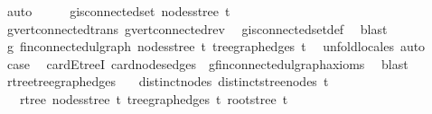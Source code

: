 \begin{isabellebody}
\ auto\isanewline
\ \ \isamarkupfalse%
\ \isamarkupfalse%
\ {\isachardoublequoteopen}g{\isachardot}{\kern0pt}is{\isacharunderscore}{\kern0pt}connected{\isacharunderscore}{\kern0pt}set\ {\isacharparenleft}{\kern0pt}nodes{\isacharunderscore}{\kern0pt}stree\ {\isacharquery}{\kern0pt}t{\isacharparenright}{\kern0pt}{\isachardoublequoteclose}\ \isamarkupfalse%
\ g{\isachardot}{\kern0pt}vert{\isacharunderscore}{\kern0pt}connected{\isacharunderscore}{\kern0pt}trans\ g{\isachardot}{\kern0pt}vert{\isacharunderscore}{\kern0pt}connected{\isacharunderscore}{\kern0pt}rev\ \isamarkupfalse%
\ g{\isachardot}{\kern0pt}is{\isacharunderscore}{\kern0pt}connected{\isacharunderscore}{\kern0pt}set{\isacharunderscore}{\kern0pt}def\ \isamarkupfalse%
\ blast\ \isanewline
\ \ \isamarkupfalse%
\ \isamarkupfalse%
\ g{\isacharcolon}{\kern0pt}\ fin{\isacharunderscore}{\kern0pt}connected{\isacharunderscore}{\kern0pt}ulgraph\ {\isachardoublequoteopen}nodes{\isacharunderscore}{\kern0pt}stree\ {\isacharquery}{\kern0pt}t{\isachardoublequoteclose}\ {\isachardoublequoteopen}tree{\isacharunderscore}{\kern0pt}graph{\isacharunderscore}{\kern0pt}edges\ {\isacharquery}{\kern0pt}t{\isachardoublequoteclose}\ \isamarkupfalse%
\ unfold{\isacharunderscore}{\kern0pt}locales\ auto\isanewline
\ \ \isamarkupfalse%
\ {\isacharquery}{\kern0pt}case\ \isamarkupfalse%
\ card{\isacharunderscore}{\kern0pt}E{\isacharunderscore}{\kern0pt}treeI\ card{\isacharunderscore}{\kern0pt}nodes{\isacharunderscore}{\kern0pt}edges\ {}{\isacharparenleft}{\kern0pt}{}{\isacharparenright}{\kern0pt}\ g{\isachardot}{\kern0pt}fin{\isacharunderscore}{\kern0pt}connected{\isacharunderscore}{\kern0pt}ulgraph{\isacharunderscore}{\kern0pt}axioms\ \isamarkupfalse%
\ blast\isanewline
{}\isamarkupfalse%
%
\endisatagproof
{\isafoldproof}%
%
\isadelimproof
\isanewline
%
\endisadelimproof
\isanewline
{}\isamarkupfalse%
\ rtree{\isacharunderscore}{\kern0pt}tree{\isacharunderscore}{\kern0pt}graph{\isacharunderscore}{\kern0pt}edges{\isacharcolon}{\kern0pt}\isanewline
\ \ \ distinct{\isacharunderscore}{\kern0pt}nodes{\isacharcolon}{\kern0pt}\ {\isachardoublequoteopen}distinct{\isacharunderscore}{\kern0pt}stree{\isacharunderscore}{\kern0pt}nodes\ t{\isachardoublequoteclose}\isanewline
\ \ \ {\isachardoublequoteopen}rtree\ {\isacharparenleft}{\kern0pt}nodes{\isacharunderscore}{\kern0pt}stree\ t{\isacharparenright}{\kern0pt}\ {\isacharparenleft}{\kern0pt}tree{\isacharunderscore}{\kern0pt}graph{\isacharunderscore}{\kern0pt}edges\ t{\isacharparenright}{\kern0pt}\ {\isacharparenleft}{\kern0pt}root{\isacharunderscore}{\kern0pt}stree\ t{\isacharparenright}{\kern0pt}{\isachardoublequoteclose}\isanewline

\end{isabellebody}
